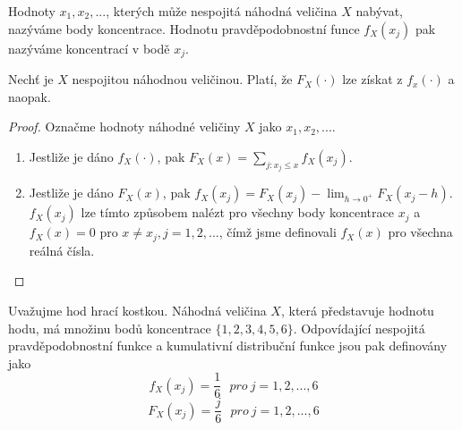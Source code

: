 Hodnoty $x_1, x_2, ...$, kterých může nespojitá náhodná veličina $X$ nabývat, nazýváme body koncentrace. Hodnotu pravděpodobnostní funce $f_X(x_j)$ pak nazýváme koncentrací v bodě $x_j$.

\begin{theorem}
Nechť je $X$ nespojitou náhodnou veličinou. Platí, že $F_X(\cdot)$ lze získat z $f_x(\cdot)$ a naopak.
\end{theorem}

\begin{proof}
Označme hodnoty náhodné veličiny $X$ jako $x_1, x_2, ...$.
\begin{enumerate}
\item  Jestliže je dáno $f_X(\cdot)$, pak $F_X(x) = \sum_{j:x_j \le x} f_X(x_j)$.
\item Jestliže je dáno $F_X(x)$, pak $f_X(x_j) = F_X(x_j) - \lim_{h \rightarrow 0^+} F_X(x_j - h)$. $f_X(x_j)$ lze tímto způsobem nalézt pro všechny body koncentrace $x_j$ a $f_X(x) = 0$ pro $x \not= x_j, j = 1, 2, ...$, čímž jsme definovali $f_X(x)$ pro všechna reálná čísla.
\end{enumerate}
\end{proof}

\begin{example}
Uvažujme hod hrací kostkou. Náhodná veličina $X$, která představuje hodnotu hodu, má množinu bodů koncentrace $\{1, 2, 3, 4, 5, 6\}$. Odpovídající nespojitá pravděpodobnostní funkce a kumulativní distribuční funkce jsou pak definovány jako
\begin{equation*}
f_X(x_j) = \frac{1}{6}~~~\textit{pro}~j = 1, 2, ..., 6
\end{equation*}
\begin{equation*}
F_X(x_j) = \frac{j}{6}~~~\textit{pro}~j = 1, 2, ..., 6
\end{equation*}
\end{example}

